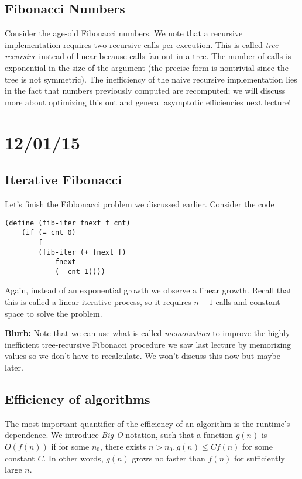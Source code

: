 \documentclass[10pt]{report}
\begin{document}
\section{Fibonacci Numbers}

Consider the age-old Fibonacci numbers. We note that a recursive implementation requires two recursive calls per execution. This is called \emph{tree recursive} instead of linear because calls fan out in a tree. The number of calls is exponential in the size of the argument (the precise form is nontrivial since the tree is not symmetric). The inefficiency of the naive recursive implementation lies in the fact that numbers previously computed are recomputed; we will discuss more about optimizing this out and general asymptotic efficiencies next lecture!

\chapter{12/01/15 --- }

\section{Iterative Fibonacci}

Let's finish the Fibbonacci problem we discussed earlier. Consider the code
\begin{verbatim}
(define (fib-iter fnext f cnt)
    (if (= cnt 0)
        f
        (fib-iter (+ fnext f)
            fnext
            (- cnt 1))))
\end{verbatim}

Again, instead of an exponential growth we observe a linear growth. Recall that this is called a linear iterative process, so it requires $n+1$ calls and constant space to solve the problem. 

\textbf{Blurb:} Note that we can use what is called \emph{memoization} to improve the highly inefficient tree-recursive Fibonacci procedure we saw last lecture by memorizing values so we don't have to recalculate. We won't discuss this now but maybe later.

\section{Efficiency of algorithms}

The most important quantifier of the efficiency of an algorithm is the runtime's dependence. We introduce \emph{Big O} notation, such that a function $g(n)$ is $O(f(n))$ if for some $n_0$, there exists $n > n_0, g(n) \leq C f(n)$ for some constant $C$. In other words, $g(n)$ grows no faster than $f(n)$ for sufficiently large $n$.
\end{document}
